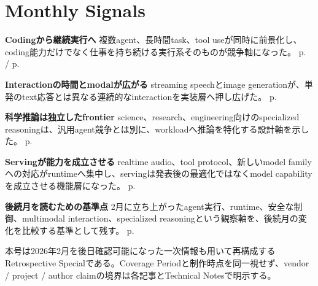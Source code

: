 \section*{Monthly Signals}
\smallskip
\noindent\textbf{Codingから継続実行へ} 複数agent、長時間task、tool useが同時に前景化し、coding能力だけでなく仕事を持ち続ける実行系そのものが競争軸になった。 \hfill{\footnotesize p.~\pageref{pkg:agentic-engineering-frontier} / p.~\pageref{pkg:open-model-agent-stack}}\par
\smallskip
\noindent\textbf{Interactionの時間とmodalが広がる} streaming speechとimage generationが、単発のtext応答とは異なる連続的なinteractionを実装層へ押し広げた。 \hfill{\footnotesize p.~\pageref{pkg:realtime-multimodal-interaction}}\par
\smallskip
\noindent\textbf{科学推論は独立したfrontier} science、research、engineering向けのspecialized reasoningは、汎用agent競争とは別に、workloadへ推論を特化する設計軸を示した。 \hfill{\footnotesize p.~\pageref{pkg:specialized-reasoning-science}}\par
\smallskip
\noindent\textbf{Servingが能力を成立させる} realtime audio、tool protocol、新しいmodel familyへの対応がruntimeへ集中し、servingは発表後の最適化ではなくmodel capabilityを成立させる機能層になった。 \hfill{\footnotesize p.~\pageref{pkg:serving-stack-catches-up}}\par
\smallskip
\noindent\textbf{後続月を読むための基準点} 2月に立ち上がったagent実行、runtime、安全な制御、multimodal interaction、specialized reasoningという観察軸を、後続月の変化を比較する基準として残す。 \hfill{\footnotesize p.~\pageref{pkg:closing-synthesis}}\par
\medskip
\begin{claimboundary}
本号は2026年2月を後日確認可能になった一次情報も用いて再構成するRetrospective Specialである。Coverage Periodと制作時点を同一視せず、vendor / project / author claimの境界は各記事とTechnical Notesで明示する。
\end{claimboundary}
\medskip
\tableofcontents
